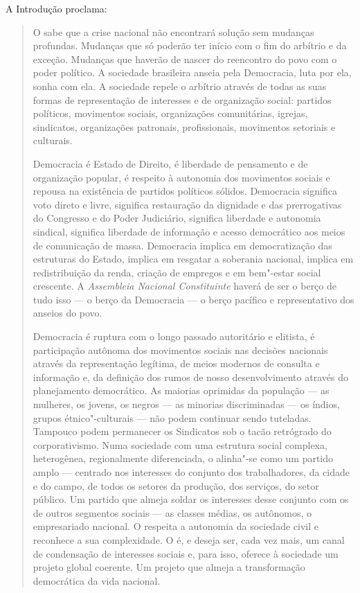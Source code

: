 A Introdução proclama: 

\begin{quote}
O  sabe que a crise nacional não encontrará solução sem
mudanças profundas. Mudanças que só poderão ter início com o fim do
arbítrio e da exceção. Mudanças que haverão de nascer do reencontro do
povo com o poder político. A sociedade brasileira anseia pela Democracia, luta por ela, sonha com
ela. A sociedade repele o arbítrio através de todas as suas formas de
representação de interesses e de organização social: partidos políticos,
movimentos sociais, organizações comunitárias, igrejas, sindicatos,
organizações patronais, profissionais, movimentos setoriais e culturais.

Democracia é Estado de Direito, é liberdade de pensamento e de
organização popular, é respeito à autonomia dos movimentos sociais e
repousa na existência de partidos políticos sólidos. Democracia
significa voto direto e livre, significa restauração da dignidade e das
prerrogativas do Congresso e do Poder Judiciário, significa liberdade e
autonomia sindical, significa liberdade de informação e acesso
democrático aos meios de comunicação de massa. Democracia implica em
democratização das estruturas do Estado, implica em resgatar a soberania
nacional, implica em redistribuição da renda, criação de empregos e em
bem"-estar social crescente. A \emph{Assembleia Nacional
Constituinte} haverá de ser o berço de tudo
isso --- o berço da Democracia --- o berço pacífico e representativo dos
anseios do povo.

Democracia é ruptura com o longo passado autoritário e
elitista, é participação autônoma dos movimentos sociais nas decisões
nacionais através da representação legítima, de meios modernos de
consulta e informação e, da definição dos rumos de nosso desenvolvimento
através do planejamento democrático. As maiorias oprimidas da população --- as mulheres, os jovens, os negros
--- as minorias discriminadas --- os índios, grupos étnico"-culturais
--- não podem continuar sendo tuteladas.
Tampouco podem permanecer os Sindicatos sob o tacão retrógrado do
corporativismo. Numa sociedade com uma estrutura social complexa,
heterogênea, regionalmente diferenciada, o  alinha"-se como um
partido amplo --- centrado nos interesses do conjunto dos trabalhadores,
da cidade e do campo, de todos os setores da produção, dos serviços, do
setor público. Um partido que almeja soldar os interesses desse conjunto com os de
outros segmentos sociais --- as classes médias, os autônomos, o
empresariado nacional. O  respeita a autonomia da sociedade civil e
reconhece a sua complexidade. O  é, e deseja ser, cada vez mais, um
canal de condensação de interesses sociais e, para isso, oferece à
sociedade um projeto global coerente. Um projeto que almeja a
transformação democrática da vida nacional.


\end{quote}
